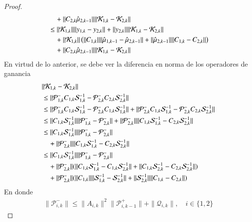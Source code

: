 \begin{proof}
\begin{equation*}
\begin{aligned}
 			& \quad + \| C_{2,k} \hat\mu_{2,k-1} \| \| \mathcal{K}_{1,k}  - \mathcal{K}_{2,k} \| \\
 			& \leq \| \mathcal{K}_{1,k} \| \|  y_{1,k} - y_{2,k}  \| + \| y_{2,k} \| \| \mathcal{K}_{1,k}  -  \mathcal{K}_{2,k}  \| \\
 			& \quad + \| \mathcal{K}_{1,k} \| \left ( \| C_{1,k}  \| \|  \hat\mu_{1,k-1} - \hat\mu_{2,k-1}  \| + \| \hat\mu_{2,k-1}  \| \| C_{1,k} - C_{2,k}  \| \right ) \\
 			& \quad + \| C_{2,k} \hat\mu_{2,k-1} \| \| \mathcal{K}_{1,k}  - \mathcal{K}_{2,k} \| 
		\end{aligned}		
	\end{equation*}
	En virtud de lo anterior, se debe ver la diferencia en norma de los operadores de ganancia
	\begin{equation*}
		\begin{aligned}
			& \| \mathcal{K}_{1,k}  - \mathcal{K}_{2,k} \| \\
			& \leq \| \mathcal{P}_{1,k}^- C_{1,k}\mathcal{S}_{1,k}^{-1} -  \mathcal{P}_{2,k}^- C_{2,k} \mathcal{S}_{2,k}^{-1} \| \\
			& \leq \| \mathcal{P}_{1,k}^- C_{1,k}\mathcal{S}_{1,k}^{-1} - \mathcal{P}_{2,k}^- C_{1,k}\mathcal{S}_{1,k}^{-1} \| + \| \mathcal{P}_{2,k}^- C_{1,k}\mathcal{S}_{1,k}^{-1} - \mathcal{P}_{2,k}^- C_{2,k}\mathcal{S}_{2,k}^{-1} \| \\
			& \leq \| C_{1,k}\mathcal{S}_{1,k}^{-1} \| \| \mathcal{P}_{1,k}^- - \mathcal{P}_{2,k}^-\| + \| \mathcal{P}_{2,k}^- \| \|  C_{1,k}\mathcal{S}_{1,k}^{-1} -  C_{2,k}\mathcal{S}_{2,k}^{-1}\| \\
			& \leq \| C_{1,k}\mathcal{S}_{1,k}^{-1} \| \| \mathcal{P}_{1,k}^- - \mathcal{P}_{2,k}^-\| \\
			& \quad + \| \mathcal{P}_{2,k}^- \| \|  C_{1,k}\mathcal{S}_{1,k}^{-1} -  C_{2,k}\mathcal{S}_{2,k}^{-1}\| \\
			& \leq \| C_{1,k}\mathcal{S}_{1,k}^{-1} \| \| \mathcal{P}_{1,k}^- - \mathcal{P}_{2,k}^-\| \\
			& \quad + \| \mathcal{P}_{2,k}^- \| ( \|  C_{1,k}\mathcal{S}_{1,k}^{-1} -  C_{1,k}\mathcal{S}_{2,k}^{-1}\| + \|  C_{1,k}\mathcal{S}_{2,k}^{-1} -  C_{2,k}\mathcal{S}_{2,k}^{-1}\|) \\
			& \quad + \| \mathcal{P}_{2,k}^- \| ( \|  C_{1,k} \| \| \mathcal{S}_{1,k}^{-1} -  \mathcal{S}_{2,k}^{-1}\| + \| \mathcal{S}_{2,k}^{-1} \| \| C_{1,k} -  C_{2,k}\|) \\
		\end{aligned}
	\end{equation*}
	En donde
	\begin{equation*}
		\begin{aligned}
			\| \mathcal{P}_{i,k}^- \|  \leq \| A_{i,k} \|^2 \| \mathcal{P}_{i,k-1}^+\| + \| \mathcal{Q}_{i,k}\|, \quad i \in \{ 1, 2 \}

\end{aligned}
\end{equation*}
\end{proof}
